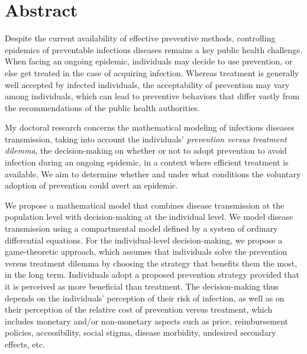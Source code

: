 
\chapter*{\centering \Large \vspace{-3cm}
		Abstract
		\vspace{-0.5cm}}

\small

Despite the current availability of effective preventive methods, controlling epidemics of preventable infectious diseases remains a key public health challenge. When facing an ongoing epidemic, individuals may decide to use prevention, or else get treated in the case of acquiring infection. Whereas treatment is generally well accepted by infected individuals, the acceptability of prevention may vary among individuals, which can lead to preventive behaviors that differ vastly from the recommendations of the public health authorities. 

My doctoral research concerns the mathematical modeling of infectious diseases transmission, taking into account the individuals' {\it prevention versus treatment dilemma}, the decision-making on whether or not to adopt prevention to avoid infection during an ongoing epidemic, in a context where efficient treatment is available. We aim to determine whether and under what conditions the voluntary adoption of prevention could avert an epidemic. 


We propose a mathematical model that combines disease transmission at the population level with decision-making at the individual level. We model disease transmission using a compartmental model defined by a system of ordinary differential equations. For the individual-level decision-making, we propose a game-theoretic approach, which assumes that individuals solve the prevention versus treatment dilemma by choosing the strategy that benefits them the most, in the long term. Individuals adopt a proposed prevention strategy provided that it is perceived as more beneficial than treatment. The decision-making thus depends on the individuals' perception of their risk of infection, as well as on their perception of the relative cost of prevention versus treatment, which includes monetary and/or non-monetary aspects such as price, reimbursement policies, accessibility, social stigma, disease morbidity, undesired secondary effects, etc. 

